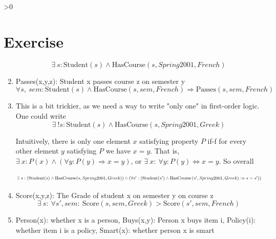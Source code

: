 \documentclass{article}
\newcounter{partCounter}
\newcounter{ExerciseCounter}
\newenvironment{Exercise}[1][-1]{
	\ifnum#1>0
	\setcounter{ExerciseCounter}{#1}
	\fi
	\section{Exercise \arabic{ExerciseCounter}}
	\setcounter{partCounter}{1}
}{
}
\begin{document}
\begin{Exercise}[1]
\begin{enumerate}
	$$ \exists ~s : \text{Student}(s) \wedge \text{HasCourse}(s, Spring2001, French) $$
	
	\vspace{15pt}
	
    \item Passes(x,y,z): Student x passes course z on semester y \\
    
    $$ \forall s, ~sem: \text{Student}(s) \wedge \text{HasCourse}(s,sem,French) \Rightarrow \text{Passes}(s,sem,French)$$
    
    \vspace{15pt}
    
    \item This is a bit trickier, as we need a way to write "only one" in first-order logic. One could write \\
    
    $$ \exists ~! s: \text{Student}(s) \wedge \text{HasCourse}(s,Spring2001, Greek) $$
    
     Intuitively, there is only one element $x$ satisfying property $P$ if-f for every other element $y$ satisfying $P$ we have $x=y$. That is, $\exists ~x : P(x) \wedge \left( \forall y : P(y) \Rightarrow x = y \right)$, or $\exists ~x : ~\forall y : P(y) \Leftrightarrow x = y$. So overall
    
    \begin{align*}
       \resizebox{\textwidth}{!}
    {%
    	$\exists ~s: \left( \text{Student}(s) \wedge \text{HasCourse}(s,Spring2001, Greek) \right) \wedge \left( \forall s': \left( \text{Student}(s') \wedge \text{HasCourse}\left(s', Spring2001, Greek \right) \Rightarrow s=s' \right) \right)$
    }
    \end{align*}
    
    \vspace{15pt}
    	
    \item Score(x,y,z): The Grade of student x on semester y on course z \\
    
    $$ \exists ~s: ~\forall s', sem: ~\text{Score}(s, sem, Greek) > \text{Score}(s',sem,French)$$ 
    
    \vspace{15pt}
    	
    \item Person(x): whether x is a person, Buys(x,y): Person x buys item i, Policy(i): whether item i is a policy, Smart(x): whether person x is smart \\
    

\end{enumerate}
\end{Exercise}
\end{document}
